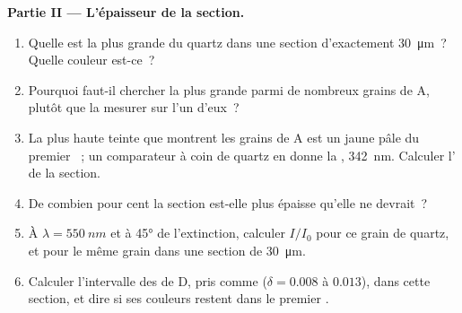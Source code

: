 \begin{problem}
\medskip
\noindent\textbf{Partie II --- L'épaisseur de la section.}
\begin{enumerate}[resume]
  \item Quelle est la plus grande  du quartz dans une section
        d'exactement \qty{30}{\micro m}~? Quelle couleur est-ce~?
  \item Pourquoi faut-il chercher la plus grande  parmi de
        nombreux grains de A, plutôt que la mesurer sur l'un d'eux~?
  \item La plus haute teinte que montrent les grains de A est un jaune pâle du
        premier ~; un comparateur à coin de quartz en donne la , \qty{342}{nm}. Calculer l' de la section.
  \item De combien pour cent la section est-elle plus épaisse qu'elle ne
        devrait~?
  \item À $\lambda = \qty{550}{nm}$ et à \ang{45} de l'extinction, calculer
        $I/I_0$ pour ce grain de quartz, et pour le même grain dans une section
        de \qty{30}{\micro m}.
  \item Calculer l'intervalle des  de D, pris comme
         ($\delta = 0.008$ à $0.013$), dans cette section, et dire si
        ses couleurs restent dans le premier .
\end{enumerate}


\end{problem}
